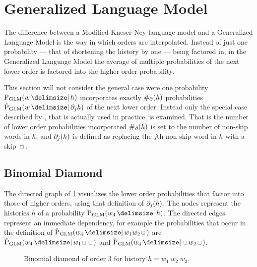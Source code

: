 \section{Generalized Language Model}

The difference between a Modified Kneser-Ney language model and a
Generalized Language Model is the way in which orders are interpolated.
Instead of just one probability --- that of shortening the history by one ---
being factored in, in the Generalized Language Model the average of multiple
probabilities of the next lower order is factored into the higher order
probability.

This section will not consider the general case were one probability
$\ProbGLM{w}{h}$ incorporates exactly $\#_\partial(h)$ probabilities
$\ProbGLM*{w}{\SkpOp_j h}$ of the next lower order.
Instead only the special case described by \textcite{Pickhardt2014}, that is
actually used in practice, is examined.
That is the number of lower order probabilities incorporated $\#_\partial(h)$
is set to the number of non-skip words in $h$, and $\partial_j(h)$ is defined as
replacing the $j$th non-skip word in $h$ with a skip $\Skp$.

\subsection{Binomial Diamond}


The directed graph of \cref{fig:history-glm} visualizes the lower order
probabilities that factor into those of higher orders, using that definition of
$\partial_j(h)$.
The nodes represent the histories $h$ of a probability $\ProbGLM{w_4}{h}$.
The directed edges represent an immediate dependency, for example the
probabilities that occur in the definition of
$\ProbGLM*{w_4}{w_1 w_2 \Skp}$ are $\ProbGLM*{w_4}{w_1 \Skp \Skp}$ and
$\ProbGLM*{w_4}{\Skp w_2 \Skp}$.

\begin{figure}
  \centering
  
  \caption{
    Binomial diamond of order 3 for history $h = w_1 \: w_2 \: w_3$.
  }
  \label{fig:history-glm}
\end{figure}

